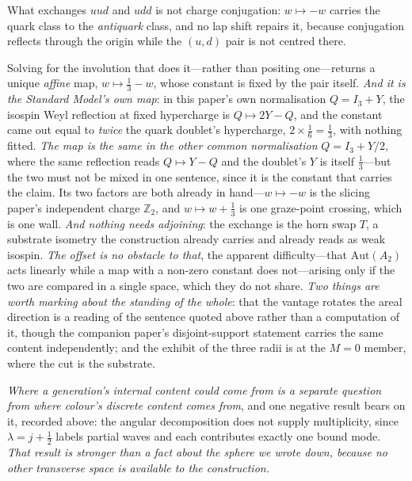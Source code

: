 \documentclass[11pt]{article}
\begin{document}
What exchanges $uud$ and $udd$ is not charge conjugation: $w\mapsto-w$ carries the quark class to the \emph{antiquark} class, and no lap shift repairs it, because conjugation reflects through the origin while the $(u,d)$ pair is not centred there. 

Solving for the involution that does it---rather than positing one---returns a unique \emph{affine} map, $w\mapsto\tfrac13-w$, whose constant is fixed by the pair itself. \emph{And it is the Standard Model's own map}: in this paper's own normalisation $Q=I_{3}+Y$, the isospin Weyl reflection at fixed hypercharge is $Q\mapsto 2Y-Q$, and the constant came out equal to \emph{twice} the quark doublet's hypercharge, $2\times\tfrac16=\tfrac13$, with nothing fitted. \emph{The map is the same in the other common normalisation} $Q=I_{3}+Y/2$, where the same reflection reads $Q\mapsto Y-Q$ and the doublet's $Y$ is itself $\tfrac13$---but the two must not be mixed in one sentence, since it is the constant that carries the claim. Its two factors are both already in hand---$w\mapsto-w$ is the slicing paper's independent charge $\mathbb{Z}_{2}$, and $w\mapsto w+\tfrac13$ is one graze-point crossing, which is one wall. \emph{And nothing needs adjoining}: the exchange is the horn swap $T$, a substrate isometry the construction already carries and already reads as weak isospin. \emph{The offset is no obstacle to that}, the apparent difficulty---that $\mathrm{Aut}(A_{2})$ acts linearly while a map with a non-zero constant does not---arising only if the two are compared in a single space, which they do not share. \emph{Two things
are worth marking about the standing of the whole}: that the vantage rotates the areal direction is a reading
of the sentence quoted above rather than a computation of it, though the companion paper's disjoint-support
statement carries the same content independently; and the exhibit of the three radii is at the $M=0$ member,
where the cut is the substrate.

\emph{Where a generation's internal content could come from is a separate question from where colour's
discrete content comes from}, and one negative result bears on it, recorded above:
the angular decomposition does not supply multiplicity, since $\lambda=j+\tfrac12$ labels partial waves and
each contributes exactly one bound mode. \emph{That result is stronger than a fact about the sphere we wrote
down, because no other transverse space is available to the construction.}
\end{document}
